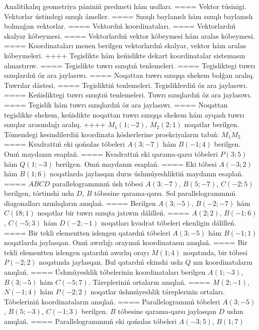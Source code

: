 Analitikalıq geometriya pániniń predmeti hám usılları.
====
Vektor túsinigi. Vektorlar ústindegi sızıqlı ámeller.
====
Sızıqlı baylanıslı hám sızıqlı baylanıslı bolmaǵan vektorlar.
====
Vektordıń koordinataları.
====
Vektorlardıń skalyar kóbeymesi.
====
Vektorlardıń vektor kóbeymesi hám aralas kóbeymesi.
====
Koordinataları menen berilgen vektorlardıń skalyar, vektor hám aralas kóbeymeleri.
++++
Tegislikte hám keńislikte dekart koordinatalar sistemasın almastırıw.
====
Tegislikte tuwrı sızıqtıń tenlemeleri.
====
Tegisliktegi tuwrı sızıqlardıń óz ara jaylasıwı.
====
Noqattan tuwrı sızıqqa shekem bolǵan aralıq. Tuwrılar dástesi.
====
Tegisliktiń tenlemeleri. Tegisliklerdiń óz ara jaylasıwı.
====
Keńisliktegi tuwrı sızıqtıń tenlemeleri. Tuwrı sızıqlardıń óz ara jaylasıwı.
====
Tegislik hám tuwrı sızıqlardıń óz ara jaylasıwı.
====
Noqattan tegislikke shekem, keńislikte noqattan tuwrı sızıqqa shekem hám ayqash tuwrı sızıqlar arasındaǵı aralıq.
++++
$M_1 (1; -2) $, $M_2 (2; 1) $ noqatlar berilgen.
Tómendegi kesindilerdiń koordinata kósherlerine proekciyaların tabıń: $\overline{M_1M_2}$
====
Kvadrattıń eki qońsılas tóbeleri $A (3; -7) $ hám
$B (-1;4) $ berilgen. Onıń maydanın esaplań.
====
Kvadrattıń eki qarama-qarsı tóbeleri $P (3; 5) $ hám
$Q (1; -3) $ berilgen. Onıń maydanın esaplań.
====
Eki tóbesi $A (-3; 2) $ hám $B (1; 6) $ noqatlarda
jaylasqan durıs úshmúyeshliktiń maydanın esaplań.
====
$ABCD$ parallelogrammnıń úsh tóbesi $A (3; -7) $,
$B (5; -7) $, $C (-2; 5) $ berilgen, tórtinshi ushı $D$,
$B$ tóbesine qarama-qarsı. Sol parallelogrammnıń diagonalları
uzınlıqların anıqlań.
====
Berilgen $A (3; -5) $, $B (-2; -7) $ hám
$C (18; 1) $ noqatlar bir tuwrı sızıqta jatıwın dálilleń.
====
$A (2;2) $, $B (-1;6) $, $C (-5;3) $ hám $D (-2;-1) $
noqatları kvadrat tóbeleri ekenligin dálilleń.
====
Bir tekli elementten islengen qatardıń tóbeleri
$A (3;-5) $ hám $B (-1;1) $ noqatlarda jaylasqan. Onıń awırlıǵı
orayınıń koordinatasın anıqlań.
====
Bir tekli elementten islengen qatardıń awırlıq orayı
$M (1;4) $ noqatında, bir tóbesi $P (-2;2) $ noqatında jaylasqan. Bul
qatardıń ekinshi ushı $Q$ nın koordinataların anıqlań.
====
Úshmúyeshlik tóbelerinin koordinataları berilgen
$A (1;-3) $, $B (3;-5) $ hám $C (-5;7) $. Tárepleriniń ortaların
anıqlań.
====
$M (2;-1) $, $N (-1;4) $ hám $P (-2;2) $ noqatlar
úshmúyeshlik táreplerinin ortaları. Tóbeleriniń koordinataların
anıqlań.
====
Parallelogramnıń tóbeleri
$A (3;-5) $, $B (5;-3) $, $C (-1;3) $ berilgen. $B$ tóbesine
qarama-qarsı jaylasqan $D$ ushın anıqlań.
====
Parallelogrammnıń eki qońsılas tóbeleri $A (-3;5) $, $B (1;7) $
